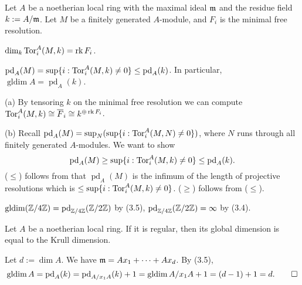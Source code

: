\documentclass{../../../small}
\renewcommand{\pd}{\operatorname{pd}}
\newcommand{\gldim}{\operatorname{gldim}}
\begin{document}
\begin{thm*}[3.5]
Let $A$ be a noetherian local ring with the maximal ideal $\mathfrak{m}$ and the residue field $k:=A/\mathfrak{m}$.
Let $M$ be a finitely generated $A$-module, and $F_i$ is the minimal free resolution.
\begin{parts}
\item $\dim_k\operatorname{Tor}_i^A(M,k)=\operatorname{rk} F_i$.
\item $\pd_A(M)=\sup\{i:\Tor_i^A(M,k)\ne0\}\le\pd_A(k)$. In particular, $\gldim A=\pd_A(k)$.
\end{parts}
\end{thm*}
\begin{pf}
(a)
By tensoring $k$ on the minimal free resolution we can compute $\operatorname{Tor}_i^A(M,k)\cong\overline F_i\cong k^{\oplus\operatorname{rk} F_i}$.

(b)
Recall $\pd_A(M)=\sup_N(\sup\{i:\Tor_i^A(M,N)\ne0\})$, where $N$ runs through all finitely generated $A$-modules.
We want to show
\[\pd_A(M)\ge\sup\{i:\Tor_i^A(M,k)\ne0\}\le\pd_A(k).\]
($\le$) follows from that $\pd_A(M)$ is the infimum of the length of projective resolutions which is $\le\sup\{i:\operatorname{Tor}_i^A(M,k)\ne0\}$.
($\ge$) follows from ($\le$).
\end{pf}

\begin{ex*}[3.6]
$\gldim(\Z/4\Z)=\pd_{\Z/4\Z}(\Z/2\Z)$ by (3.5), $\pd_{\Z/4\Z}(\Z/2\Z)=\infty$ by (3.4).
\end{ex*}

\begin{thm*}[3.7]
Let $A$ be a noetherian local ring.
If it is regular, then its global dimension is equal to the Krull dimension.
\end{thm*}
\begin{pf}
Let $d:=\dim A$.
We have $\mathfrak{m}=Ax_1+\cdots+Ax_d$.
By (3.5),
\[\gldim A=\pd_A(k)=\pd_{A/x_1A}(k)+1=\gldim A/x_1A+1=(d-1)+1=d.\qedhere\]
\end{pf}
\end{document}
